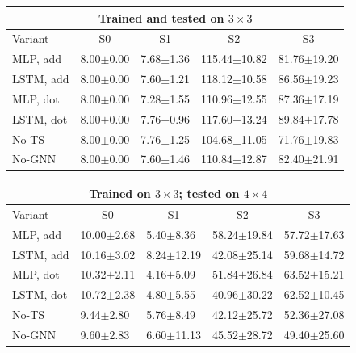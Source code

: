 \begin{table}
\centering
\small
\setlength{\tabcolsep}{2.2pt}
\renewcommand{\arraystretch}{1.02}

\begin{tabular}{@{\hspace{2pt}}l|l|l|l|l@{\hspace{2pt}}}
\toprule
\multicolumn{5}{c}{Trained and tested on $3\times 3$} \\
\midrule
Variant & \multicolumn{1}{c|}{S0} & \multicolumn{1}{c|}{S1} & \multicolumn{1}{c|}{S2} & \multicolumn{1}{c}{S3} \\
\midrule
MLP, add    & 8.00$\pm$0.00 & 7.68$\pm$1.36 & 115.44$\pm$10.82 & 81.76$\pm$19.20 \\
LSTM, add   & 8.00$\pm$0.00 & 7.60$\pm$1.21 & 118.12$\pm$10.58 & 86.56$\pm$19.23 \\
MLP, dot    & 8.00$\pm$0.00 & 7.28$\pm$1.55 & 110.96$\pm$12.55 & 87.36$\pm$17.19 \\
LSTM, dot   & 8.00$\pm$0.00 & 7.76$\pm$0.96 & 117.60$\pm$13.24 & 89.84$\pm$17.78 \\
No-TS       & 8.00$\pm$0.00 & 7.76$\pm$1.25 & 104.68$\pm$11.05 & 71.76$\pm$19.83 \\
No-GNN      & 8.00$\pm$0.00 & 7.60$\pm$1.46 & 110.84$\pm$12.87 & 82.40$\pm$21.91 \\
\bottomrule
\end{tabular}

\vspace{4pt}

\begin{tabular}{@{\hspace{2pt}}l|l|l|l|l@{\hspace{2pt}}}
\toprule
\multicolumn{5}{c}{Trained on $3\times 3$; tested on $4\times 4$} \\
\midrule
Variant & \multicolumn{1}{c|}{S0} & \multicolumn{1}{c|}{S1} & \multicolumn{1}{c|}{S2} & \multicolumn{1}{c}{S3} \\
\midrule
MLP, add    & 10.00$\pm$2.68 & 5.40$\pm$8.36 & 58.24$\pm$19.84 & 57.72$\pm$17.63 \\
LSTM, add   & 10.16$\pm$3.02 & 8.24$\pm$12.19 & 42.08$\pm$25.14 & 59.68$\pm$14.72 \\
MLP, dot    & 10.32$\pm$2.11 & 4.16$\pm$5.09 & 51.84$\pm$26.84 & 63.52$\pm$15.21 \\
LSTM, dot   & 10.72$\pm$2.38 & 4.80$\pm$5.55 & 40.96$\pm$30.22 & 62.52$\pm$10.45 \\
No-TS       & 9.44$\pm$2.80 & 5.76$\pm$8.49 & 42.12$\pm$25.72 & 52.36$\pm$27.08 \\
No-GNN      & 9.60$\pm$2.83 & 6.60$\pm$11.13 & 45.52$\pm$28.72 & 49.40$\pm$25.60 \\
\bottomrule
\end{tabular}


\end{table}
